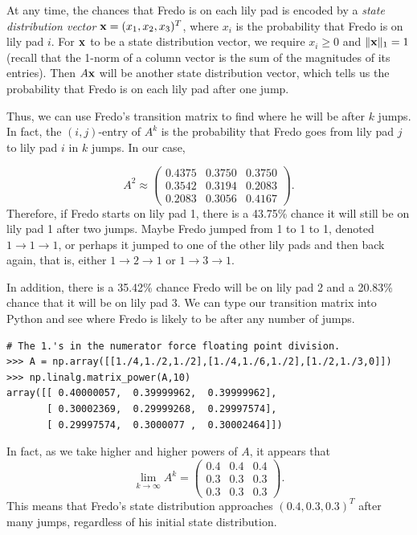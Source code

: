 At any time, the chances that Fredo is on each lily pad is encoded by a \emph{state distribution vector} ${\bf x} = (x_1, x_2, x_3)^T$, where $x_i$ is the probability that Fredo is on lily pad $i$. 
For ${\bf x}$ to be a state distribution vector, we require $x_i\geq 0$ and $\|{\bf x}\|_1=1$ (recall that the 1-norm of a column vector is the sum of the magnitudes of its entries). 
Then $A{\bf x}$ will be another state distribution vector, which tells us the probability that Fredo is on each lily pad after one jump.

Thus, we can use Fredo's transition matrix to find where he will be after $k$ jumps. In fact, the $(i,j)$-entry of $A^k$ is the probability that Fredo goes from lily pad $j$ to lily pad $i$ in $k$ jumps. 
In our case,

\[
A^2 \approx \begin{pmatrix}
0.4375 & 0.3750 & 0.3750\\
0.3542 & 0.3194 & 0.2083\\
0.2083 & 0.3056 & 0.4167
\end{pmatrix}.
\]
Therefore, if Fredo starts on lily pad 1, there is a 43.75\% chance it will still be on lily pad 1 after two jumps.
Maybe Fredo jumped from 1 to 1 to 1, denoted $1 \rightarrow 1 \rightarrow 1$, or perhaps it jumped to one of the other lily pads and then back again, that is, either $1 \rightarrow 2 \rightarrow 1$ or $1 \rightarrow 3 \rightarrow 1$.

In addition, there is a 35.42\% chance Fredo will be on lily pad 2 and a 20.83\% chance that it will be on lily pad 3.
We can type our transition matrix into Python and see where Fredo is likely to be after any number of jumps.

\begin{lstlisting}
# The 1.'s in the numerator force floating point division.
>>> A = np.array([[1./4,1./2,1./2],[1./4,1./6,1./2],[1./2,1./3,0]])
>>> np.linalg.matrix_power(A,10)
array([[ 0.40000057,  0.39999962,  0.39999962],
       [ 0.30002369,  0.29999268,  0.29997574],
       [ 0.29997574,  0.3000077 ,  0.30002464]])
\end{lstlisting}

In fact, as we take higher and higher powers of $A$, it appears that 
\[
\lim_{k \rightarrow \infty} A^k = \begin{pmatrix}
0.4 & 0.4 & 0.4\\
0.3 & 0.3 & 0.3\\
0.3 & 0.3 & 0.3
\end{pmatrix}.
\]
This means that Fredo's state distribution approaches $(0.4, 0.3, 0.3)^T$ after many jumps, regardless of his initial state distribution.

